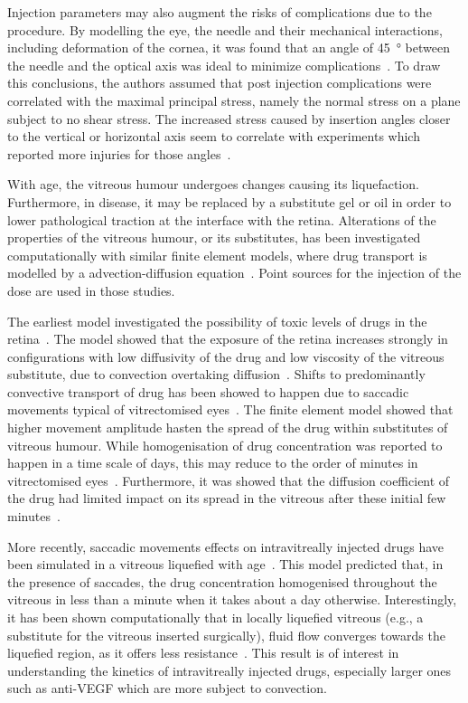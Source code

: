 \documentclass{article}
\begin{document}
Injection parameters may also augment the risks of complications due to the procedure.
By modelling the eye, the needle and their mechanical interactions, including deformation of the cornea, it was found that an angle of \SI{45}{\degree} between the needle and the optical axis was ideal to minimize complications~\cite{Karimi_2018}.
To draw this conclusions, the authors assumed that post injection complications were correlated with the maximal principal stress, namely the normal stress on a plane subject to no shear stress.  
The increased stress caused by insertion angles closer to the vertical or horizontal axis seem to correlate with experiments which reported more injuries for those angles~\cite{Karimi_2018}.

With age, the vitreous humour undergoes changes causing its liquefaction.
Furthermore, in disease, it may be replaced by a substitute gel or oil in order to lower pathological traction at the interface with the retina.
Alterations of the properties of the vitreous humour, or its substitutes, has been investigated computationally with similar finite element models, where drug transport is modelled by a advection-diffusion equation~\cite{Kathawate_2008,Modareszadeh_2012}.
Point sources for the injection of the dose are used in those studies.

The earliest model investigated the possibility of toxic levels of drugs in the retina~\cite{Kathawate_2008}.
The model showed that the exposure of the retina increases strongly in configurations with low diffusivity of the drug and low viscosity of the vitreous substitute, due to convection overtaking diffusion~\cite{Kathawate_2008}.
Shifts to predominantly convective transport of drug has been showed to happen due to saccadic movements typical of vitrectomised eyes~\cite{Modareszadeh_2012}.
The finite element model showed that higher movement amplitude hasten the spread of the drug within substitutes of vitreous humour.
While homogenisation of drug concentration was reported to happen in a time scale of days, this may reduce to the order of minutes in vitrectomised eyes~\cite{Modareszadeh_2012}.
Furthermore, it was showed that the diffusion coefficient of the drug had limited impact on its spread in the vitreous after these initial few minutes~\cite{Modareszadeh_2012}.

More recently, saccadic movements effects on intravitreally injected drugs have been simulated in a vitreous liquefied with age~\cite{Ferroni_2020}.
This model predicted that, in the presence of saccades, the drug concentration homogenised throughout the vitreous in less than a minute when it takes about a day otherwise.
Interestingly, it has been shown computationally that in locally liquefied vitreous (e.g., a substitute for the vitreous inserted surgically), fluid flow converges towards the liquefied region, as it offers less resistance~\cite{Khoobyar_2022}.
This result is of interest in understanding the kinetics of intravitreally injected drugs, especially larger ones such as anti-VEGF which are more subject to convection.
\end{document}
